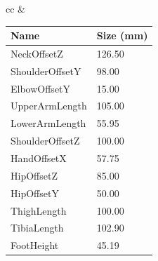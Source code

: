


\begin{figure}[t!]
\begin{tabularx}{\textwidth}{cc}
& 
\begin{tabular}{|l|l|}
\hline
{\textbf{Name}} & \textbf{Size (mm)} \\ \hline
{NeckOffsetZ} & 126.50 \\ \hline
{ShoulderOffsetY} & 98.00 \\  \hline
{ElbowOffsetY} & 15.00 \\  \hline
{UpperArmLength} & 105.00 \\  \hline
{LowerArmLength} & 55.95 \\  \hline
{ShoulderOffsetZ} & 100.00 \\  \hline
{HandOffsetX} & 57.75 \\  \hline
{HipOffsetZ} & 85.00 \\  \hline
{HipOffsetY} & 50.00 \\  \hline
{ThighLength} & 100.00 \\  \hline
{TibiaLength} & 102.90 \\  \hline
{FootHeight} & 45.19 \\  \hline

\end{tabular}
\end{tabularx}
\end{figure}
